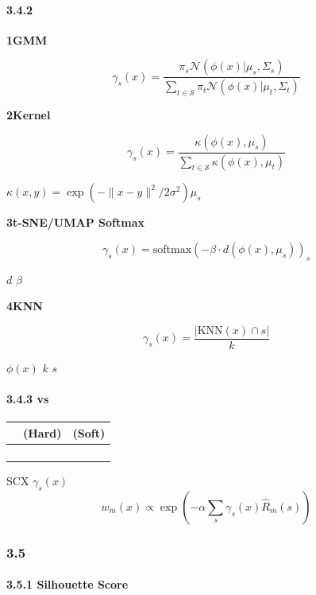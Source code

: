 \documentclass[
  12pt,
]{article}
\begin{document}
\paragraph{3.4.2 }\label{ux5b9eux73b0ux65b9ux5f0f}

\textbf{ 1GMM }

\[\gamma_s(x) = \frac{\pi_s \mathcal{N}(\phi(x) | \mu_s, \Sigma_s)}{\sum_{t \in \mathcal{S}} \pi_t \mathcal{N}(\phi(x) | \mu_t, \Sigma_t)}\]

\textbf{ 2Kernel }

\[\gamma_s(x) = \frac{\kappa(\phi(x), \mu_s)}{\sum_{t \in \mathcal{S}} \kappa(\phi(x), \mu_t)}\]

 \(\kappa(x,y) = \exp(-\|x - y\|^2 / 2\sigma^2)\)\(\mu_s\)


\textbf{ 3t-SNE/UMAP  Softmax}

\[\gamma_s(x) = \text{softmax}(-\beta \cdot d(\phi(x), \mu_s))_s\]

 \(d\) \(\beta\) 

\textbf{ 4KNN }

\[\gamma_s(x) = \frac{|\text{KNN}(x) \cap s|}{k}\]

 \(\phi(x)\)  \(k\)  \(s\) 

\paragraph{3.4.3  vs
}\label{ux8f6f-vs-ux786cux8d4bux503cux7684ux6743ux8861}

\begin{longtable}[]{@{}lll@{}}
\toprule\noalign{}
 &  (Hard) &  (Soft) \\
\midrule\noalign{}
\endhead
\bottomrule\noalign{}
\endlastfoot
 &  &  \\
 &  &  \\
 &  &  \\
 &  &  \\
\end{longtable}

SCX  \(\gamma_s(x)\) 
\[w_m(x) \propto \exp(-\alpha \sum_s \gamma_s(x) \hat{R}_m(s))\]


\subsubsection{3.5
}\label{ux72b6ux6001ux7c92ux5ea6ux9009ux62e9}

\paragraph{3.5.1 Silhouette Score}\label{silhouette-score}
\end{document}
